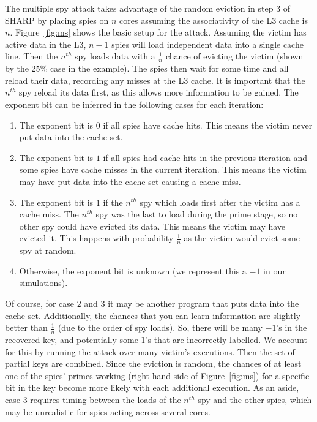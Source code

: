 \documentclass[12pt]{article}
\begin{document}
The multiple spy attack takes advantage of the random eviction in step $3$ of SHARP by placing spies on $n$ cores assuming the associativity of the L3 cache is $n$.
Figure~\ref{fig:ms} shows the basic setup for the attack.
Assuming the victim has active data in the L3, $n-1$ spies will load independent data into a single cache line.
Then the $n^{th}$ spy loads data with a $\frac{1}{n}$ chance of evicting the victim (shown by the $25\%$ case in the example).
The spies then wait for some time and all reload their data, recording any misses at the L3 cache.
It is important that the $n^{th}$ spy reload its data first, as this allows more information to be gained.
The exponent bit can be inferred in the following cases for each iteration:

\begin{enumerate}

\item The exponent bit is $0$ if all spies have cache hits. This means the victim never put data into the cache set.
\item The exponent bit is $1$ if all spies had cache hits in the previous iteration and some spies have cache misses in the current iteration. This means the victim may have put data into the cache set causing a cache miss.
\item The exponent bit is $1$ if the $n^{th}$ spy which loads first after the victim has a cache miss. The $n^{th}$ spy was the last to load during the prime stage, so no other spy could have evicted its data. This means the victim may have evicted it. This happens with probability $\frac{1}{n}$ as the victim would evict some spy at random.
\item Otherwise, the exponent bit is unknown (we represent this a $-1$ in our simulations).

\end{enumerate}

Of course, for case $2$ and $3$ it may be another program that puts data into the cache set.
Additionally, the chances that you can learn information are slightly better than $\frac{1}{n}$ (due to the order of spy loads).
So, there will be many $-1$'s in the recovered key, and potentially some $1$'s that are incorrectly labelled. 
We account for this by running the attack over many victim's executions.
Then the set of partial keys are combined.
Since the eviction is random, the chances of at least one of the spies' primes working (right-hand side of Figure~\ref{fig:ms}) for a specific bit in the key become more likely with each additional execution.
As an aside, case $3$ requires timing between the loads of the $n^{th}$ spy and the other spies, which may be unrealistic for spies acting across several cores.
\end{document}
